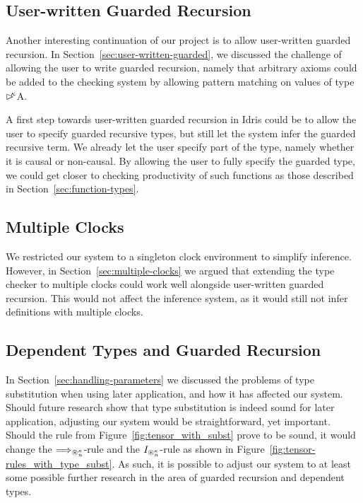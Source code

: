 \subsection{User-written Guarded Recursion}
Another interesting continuation of our project is to allow user-written
guarded recursion. In Section~\ref{sec:user-written-guarded}, we discussed the
challenge of allowing the user to write guarded recursion, namely that arbitrary
axioms could be added to the checking system by allowing pattern matching on
values of type $\rhd^{\!\!\kappa}$A. 


A first step towards user-written guarded recursion in Idris could be to
allow the user to specify guarded recursive types, but still let the system infer the
guarded recursive term. We already let the user specify part of the type, namely
whether it is causal or non-causal. By allowing the user to fully specify the guarded type, we could get
closer to checking productivity of such functions as those described in Section~\ref{sec:function-types}.

\subsection{Multiple Clocks}
We restricted our system to a singleton clock environment to simplify
inference. However, in Section~\ref{sec:multiple-clocks} we argued that
extending the type checker to multiple clocks could work well alongside
user-written guarded recursion. This would not affect the inference system, as
it would still not infer definitions with multiple clocks. 

\subsection{Dependent Types and Guarded Recursion}
In Section~\ref{sec:handling-parameters} we discussed the problems of type
substitution when using later application, and how it has affected our
system. Should future research show that type substitution is indeed sound for
later application, adjusting our system would be straightforward, yet
important. Should the rule from Figure~\ref{fig:tensor_with_subst} prove to be
sound, it would change the $\Longrightarrow_{\circledast^\kappa_n}$-rule and the
$I_{\circledast^\kappa_n}$-rule as shown in
Figure~\ref{fig:tensor-rules_with_type_subst}. As such, it is possible to adjust
our system to at least some possible further research in the area of guarded recursion and
dependent types.

